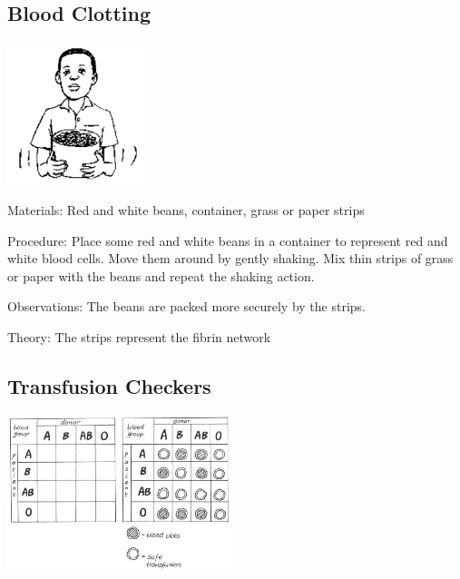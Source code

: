 \begin{multicols}{2}
\subsection{Blood Clotting} %

\begin{center}
\includegraphics[width=0.3\textwidth]{./img/source/blood-clots.png}
\end{center}

\begin{description*}
\item[Materials:]{Red and white beans, container, grass or paper strips}
\item[Procedure:]{Place some red and white beans in a container to represent red and white blood cells.
Move them around by gently shaking. Mix thin strips of grass or paper with the beans and
repeat the shaking action. }
\item[Observations:]{The beans are packed more securely by the strips.}
\item[Theory:]{The strips
represent the fibrin network }
\end{description*}

\columnbreak

\subsection{Transfusion Checkers} %

\begin{center}
\includegraphics[width=0.49\textwidth]{./img/vso/transfusion-checkers.jpg}
\end{center}


\end{multicols}
